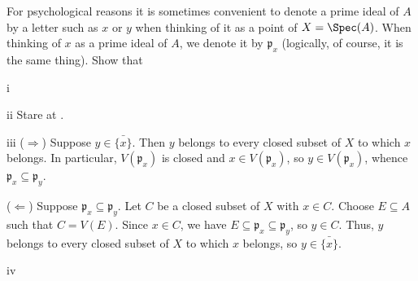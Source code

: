 \begin{exercise}
For psychological reasons it is sometimes convenient to denote a prime ideal of \(A\) by a letter such as \(x\) or \(y\) when thinking of it as a point of \(X = \Spec(A)\).
When thinking of \(x\) as a prime ideal of \(A\), we denote it by \(\mathfrak p_x\) (logically, of course, it is the same thing).
Show that
\end{exercise}

\begin{partsolution}{i}

\end{partsolution}

\begin{partsolution}{ii}
Stare at .
\end{partsolution}

\begin{partsolution}{iii}
(\(\Rightarrow\))
Suppose \(y \in \bar{\{x\}}\).
Then \(y\) belongs to every closed subset of \(X\) to which \(x\) belongs.
In particular, \(V(\mathfrak{p}_x)\) is closed and \(x \in V(\mathfrak{p}_x)\), so \(y \in V(\mathfrak{p}_x)\), whence \(\mathfrak{p}_x \subseteq \mathfrak{p}_y\).

(\(\Leftarrow\))
Suppose \(\mathfrak{p}_x \subseteq \mathfrak{p}_y\).
Let \(C\) be a closed subset of \(X\) with \(x \in C\).
Choose \(E \subseteq A\) such that \(C = V(E)\).
Since \(x \in C\), we have \(E \subseteq \mathfrak{p}_x \subseteq \mathfrak{p}_y\), so \(y \in C\).
Thus, \(y\) belongs to every closed subset of \(X\) to which \(x\) belongs, so \(y \in \bar{\{x\}}\).
\end{partsolution}

\begin{partsolution}{iv}

\end{partsolution}